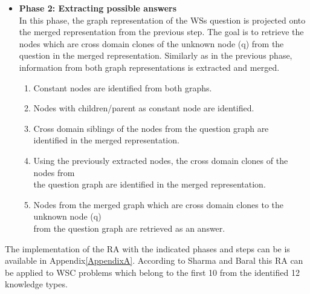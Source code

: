 \begin{itemize}
	\item \textbf{Phase 2: Extracting possible answers}\\
	In this phase, the graph representation of the WSs question is projected onto the merged representation from the previous step. The goal is to retrieve the nodes which are cross domain clones of the unknown node (q) from the question in the merged representation. Similarly as in the previous phase, information from both graph representations is extracted and merged.
	\begin{enumerate}
		\item Constant nodes are identified from both graphs.
		\item Nodes with children/parent as constant node are identified. 
		\item Cross domain siblings of the nodes from the question graph are \\ identified in the merged representation.
		\item Using the previously extracted nodes, the cross domain clones of the nodes from\\ the question graph are identified in the merged representation.
		\item Nodes from the merged graph which are cross domain clones to the unknown node (q)\\ from the question graph are retrieved as an answer.
	\end{enumerate}
\end{itemize}

The implementation of the RA with the indicated phases and steps can be is available in Appendix\ref{AppendixA}. 
According to Sharma and Baral \cite{2018CommonsenseKT} this RA can be applied to WSC problems which belong to the first 10 from the identified 12 knowledge types. 

